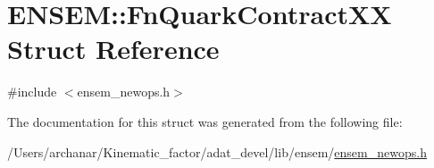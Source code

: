 \hypertarget{structENSEM_1_1FnQuarkContractXX}{}\section{E\+N\+S\+EM\+:\+:Fn\+Quark\+Contract\+XX Struct Reference}
\label{structENSEM_1_1FnQuarkContractXX}


{\ttfamily \#include $<$ensem\+\_\+newops.\+h$>$}



The documentation for this struct was generated from the following file\+:\begin{DoxyCompactItemize}
\item 
/\+Users/archanar/\+Kinematic\+\_\+factor/adat\+\_\+devel/lib/ensem/\mbox{\hyperlink{lib_2ensem_2ensem__newops_8h}{ensem\+\_\+newops.\+h}}\end{DoxyCompactItemize}
